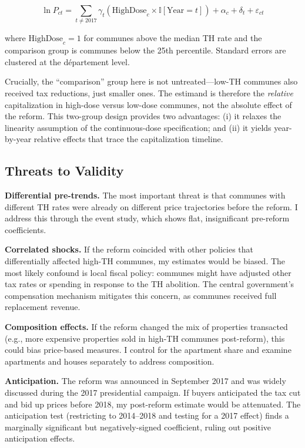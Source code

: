 \documentclass[12pt]{article}
\newcommand{\ind}{\mathbb{I}}
\begin{document}
\begin{equation}
\ln P_{ct} = \sum_{t \neq 2017} \gamma_t (\text{HighDose}_c \times \ind[\text{Year} = t]) + \alpha_c + \delta_t + \varepsilon_{ct}
\label{eq:twogroup}
\end{equation}

\noindent where $\text{HighDose}_c = 1$ for communes above the median TH rate and the comparison group is communes below the 25th percentile. Standard errors are clustered at the d\'{e}partement level.

Crucially, the ``comparison'' group here is not untreated---low-TH communes also received tax reductions, just smaller ones. The estimand is therefore the \emph{relative} capitalization in high-dose versus low-dose communes, not the absolute effect of the reform. This two-group design provides two advantages: (i) it relaxes the linearity assumption of the continuous-dose specification; and (ii) it yields year-by-year relative effects that trace the capitalization timeline.

\subsection{Threats to Validity}

\textbf{Differential pre-trends.} The most important threat is that communes with different TH rates were already on different price trajectories before the reform. I address this through the event study, which shows flat, insignificant pre-reform coefficients.

\textbf{Correlated shocks.} If the reform coincided with other policies that differentially affected high-TH communes, my estimates would be biased. The most likely confound is local fiscal policy: communes might have adjusted other tax rates or spending in response to the TH abolition. The central government's compensation mechanism mitigates this concern, as communes received full replacement revenue.

\textbf{Composition effects.} If the reform changed the mix of properties transacted (e.g., more expensive properties sold in high-TH communes post-reform), this could bias price-based measures. I control for the apartment share and examine apartments and houses separately to address composition.

\textbf{Anticipation.} The reform was announced in September 2017 and was widely discussed during the 2017 presidential campaign. If buyers anticipated the tax cut and bid up prices before 2018, my post-reform estimate would be attenuated. The anticipation test (restricting to 2014--2018 and testing for a 2017 effect) finds a marginally significant but negatively-signed coefficient, ruling out positive anticipation effects.
\end{document}
